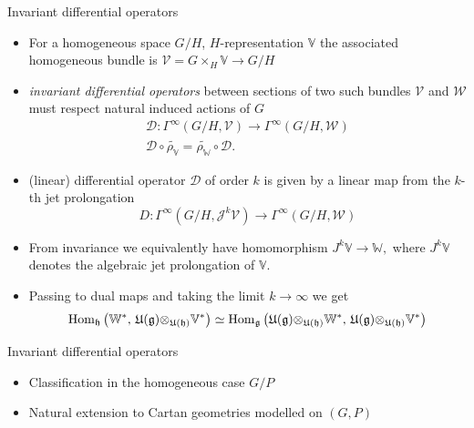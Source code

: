 \documentclass[10pt]{beamer}
\begin{document}
\begin{frame}{Invariant differential operators}
\begin{itemize}[<+- | alert@+>]
	\item For a homogeneous space $G/H$, $H$-representation $\mathbb{V}$ the associated homogeneous bundle is $\mathcal{V} = G \times_H \mathbb{V} \to G/H$
	\item \emph{invariant differential operators} between sections of two such bundles $\mathcal{V}$ and $\mathcal{W}$ must respect natural induced actions of $G$
	\begin{gather*}
\mathcal{D} \colon \Gamma^\infty(G/H, \mathcal{V}) \to \Gamma^\infty(G/H, \mathcal{W}) \\
\mathcal{D} \circ \widetilde{\rho_\mathbb{V}} =  \widetilde{\rho_\mathbb{W}} \circ \mathcal{D}.
\end{gather*}
\item (linear) differential operator $\mathcal{D}$ of order $k$ is given by a linear map from the $k$-th jet prolongation 
\[
D\colon \Gamma^\infty(G/H,\mathcal{J}^k \mathcal{V}) \to \Gamma^\infty(G/H, \mathcal{W})
\]
\item From invariance we equivalently have homomorphism $J^k \mathbb{V} \to \mathbb{W},$ where  $J^k \mathbb{V}$ denotes the algebraic jet prolongation of $\mathbb{V}.$
\item Passing to dual maps and taking the limit $k \to \infty$ we get 
\[
\mathrm{Hom}_{\mathfrak{h}}\left(\mathbb{W}^*, \, \mathfrak{U(g)\otimes_{U(h)}}\mathbb{V}^*\right) \simeq \mathrm{Hom}_{\mathfrak{g}}\left(\mathfrak{U(g)\otimes_{U(h)}}\mathbb{W}^*, \, \mathfrak{U(g)\otimes_{U(h)}}\mathbb{V}^*\right)
\]
\end{itemize}
 

\end{frame}


\begin{frame}{Invariant differential operators}
\begin{itemize}
	\item Classification in the homogeneous case $G/P$
	\item Natural extension to Cartan geometries modelled on $(G, P)$
\end{itemize}
\end{frame}

\end{document}
